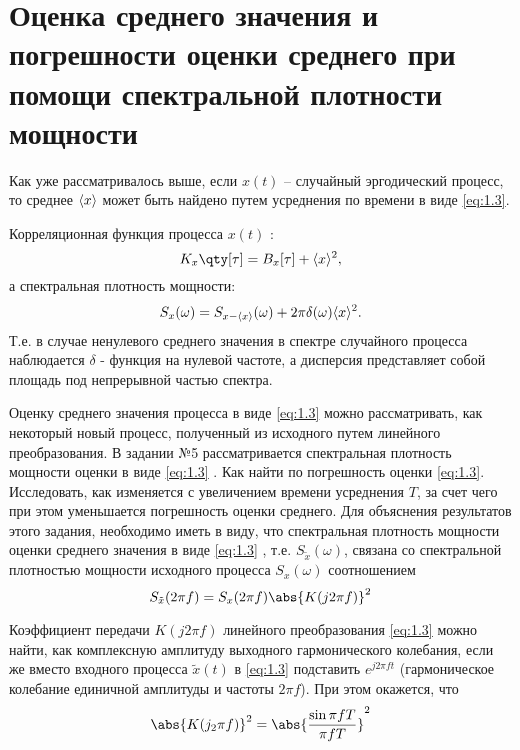 \section{Оценка среднего значения и погрешности оценки среднего при помощи спектральной 
плотности мощности}%

Как уже рассматривалось выше, если $x(t)$ -- случайный эргодический процесс, то среднее
$\langle x\rangle$ может быть найдено путем усреднения по времени в виде \eqref{eq:1.3}.

Корреляционная функция процесса $x(t)$ :
\begin{equation}
    \label{eq:}
    K_x\qty[\tau] = B_x[\tau] + \mean{x}^2,
\end{equation}
а спектральная плотность мощности:
\begin{equation}
    \label{eq:}
    S_x(\omega) = S_{x-\langle x\rangle}(\omega) + 2 \pi \delta(\omega) \langle x\rangle^2.
\end{equation}
Т.е. в случае ненулевого среднего значения в спектре случайного процесса наблюдается $\delta$ - 
функция на нулевой частоте, а дисперсия представляет собой площадь под непрерывной частью спектра.

Оценку среднего значения процесса в виде \eqref{eq:1.3}  можно рассматривать, как некоторый новый процесс,
полученный из исходного путем линейного преобразования. В задании №5 рассматривается спектральная плотность мощности  оценки  в виде \eqref{eq:1.3} . Как найти по  погрешность оценки \eqref{eq:1.3}. Исследовать, как изменяется  с увеличением времени усреднения $T$, за счет чего при этом уменьшается погрешность оценки среднего.
Для объяснения результатов этого задания, необходимо иметь в виду, что спектральная плотность мощности оценки среднего значения в виде \eqref{eq:1.3} , т.е. $S_{\tilde x}(\omega)$, связана со спектральной плотностью мощности исходного процесса $S_x(\omega)$  соотношением
\begin{equation}
    \label{eq:4.1}
    S_{\tilde x}(2 \pi f) = S_x(2 \pi f) \abs{K(j 2 \pi f)}^2
\end{equation}

Коэффициент передачи  $K(j 2 \pi f)$ линейного преобразования \eqref{eq:1.3}  можно найти, как комплексную амплитуду выходного гармонического колебания, если же вместо входного 
процесса  $\tilde x(t)$ в \eqref{eq:1.3}  подставить $e^{j 2 \pi f t}$ (гармоническое колебание единичной амплитуды и частоты $2 \pi f$). При этом окажется, что 
\begin{equation}
    \label{eq:4.2}
    \abs{K(j_{2} \pi f)}^2 = \abs{\frac{\sin{\pi f T}}{\pi f T}}^2
\end{equation}

